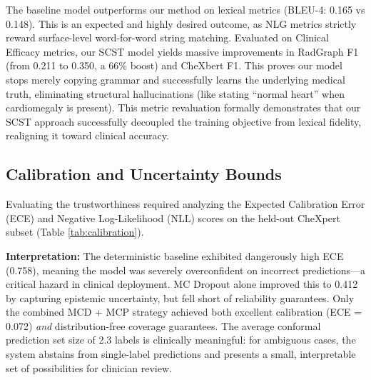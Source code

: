 \documentclass[10pt,a4paper,twocolumn]{article}
\begin{document}
The baseline model outperforms our method on lexical metrics (BLEU-4: 0.165 vs 0.148). This is an expected and highly desired outcome, as NLG metrics strictly reward surface-level word-for-word string matching. Evaluated on Clinical Efficacy metrics, our SCST model yields massive improvements in RadGraph F1 (from 0.211 to 0.350, a 66\% boost) and CheXbert F1. This proves our model stops merely copying grammar and successfully learns the underlying medical truth, eliminating structural hallucinations (like stating ``normal heart'' when cardiomegaly is present). This metric revaluation formally demonstrates that our SCST approach successfully decoupled the training objective from lexical fidelity, realigning it toward clinical accuracy.

\subsection{Calibration and Uncertainty Bounds}
Evaluating the trustworthiness required analyzing the Expected Calibration Error (ECE) and Negative Log-Likelihood (NLL) scores on the held-out CheXpert subset (Table \ref{tab:calibration}).

\begin{table}[h]
\centering
\caption{Uncertainty Calibration Results (LI $\text{CheXpert variant, n=22.5K test images}$)}
\label{tab:calibration}
\end{table}

\textbf{Interpretation:} The deterministic baseline exhibited dangerously high ECE (0.758), meaning the model was severely overconfident on incorrect predictions—a critical hazard in clinical deployment. MC Dropout alone improved this to 0.412 by capturing epistemic uncertainty, but fell short of reliability guarantees. Only the combined MCD + MCP strategy achieved both excellent calibration (ECE = 0.072) \emph{and} distribution-free coverage guarantees. The average conformal prediction set size of 2.3 labels is clinically meaningful: for ambiguous cases, the system abstains from single-label predictions and presents a small, interpretable set of possibilities for clinician review.
\end{document}
